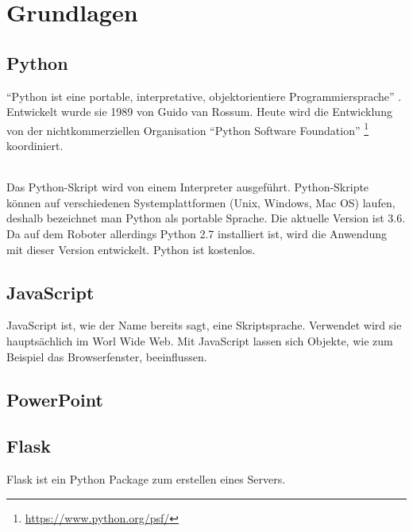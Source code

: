 \chapter{Grundlagen}\label{sec:grundlagen}
\section{Python}\label{sec:python}
"`Python ist eine portable, interpretative, objektorientiere
Programmiersprache"' \cite{Weigend2017}. Entwickelt wurde sie 1989 von Guido van
Rossum. Heute wird die Entwicklung von der nichtkommerziellen Organisation
"`Python Software Foundation"' \footnote{\url{https://www.python.org/psf/}}
koordiniert.

\subparagraph{}
Das Python-Skript wird von einem Interpreter ausgeführt. Python-Skripte können
auf verschiedenen Systemplattformen (Unix, Windows, Mac OS) laufen, deshalb
bezeichnet man Python als portable Sprache. Die aktuelle Version ist 3.6. Da auf
dem Roboter allerdings Python 2.7 installiert ist, wird die Anwendung mit dieser
Version entwickelt. Python ist kostenlos. \cite{Weigend2017}

\section{JavaScript}\label{sec:javascript}
JavaScript ist, wie der Name bereits sagt, eine Skriptsprache. Verwendet wird
sie hauptsächlich im Worl Wide Web. Mit JavaScript lassen sich Objekte, wie zum
Beispiel das Browserfenster, beeinflussen. \cite{Steyer2010}

\section{PowerPoint}\label{sec:powerpoint}


\section{Flask}\label{sec:flask}
Flask ist ein Python Package zum erstellen eines Servers.